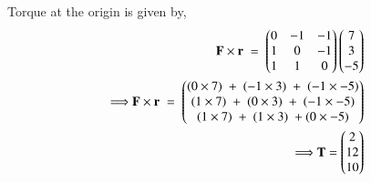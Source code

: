 \documentclass[journal,12pt,twocolumn]{IEEEtran}
\begin{document}
Torque at the origin is given by,
\begin{align}
\mathbf{F \times r} \;=\; \begin{pmatrix}0 & -1 & -1\\ 1& 0 &-1 \\ 1 & 1 & 0 \end{pmatrix} \begin{pmatrix}7\\3\\-5\end{pmatrix}  
\\
\Longrightarrow\mathbf{F \times r} \;=\; \begin{pmatrix}(0 \times 7) \; + \; (-1 \times 3) \; + \; (-1 \times -5)\\(1 \times 7) \; + \; (0 \times 3) \; + \; (-1 \times -5)\\(1 \times 7) \; + \; (1 \times 3) \; + (0 \times -5)\end{pmatrix} 
\\
\Longrightarrow \mathbf{T} = \begin{pmatrix}2 \\  12  \\ 10 \end{pmatrix}
\end{align}
\end{document}
